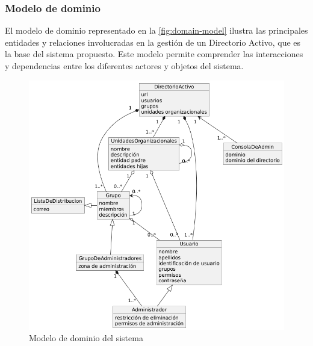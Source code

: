 \subsubsection{Modelo de dominio}

El modelo de dominio representado en la \autoref{fig:domain-model} ilustra las principales entidades y relaciones involucradas en la gestión de un Directorio Activo, que es la base del sistema propuesto. Este modelo permite comprender las interacciones y dependencias entre los diferentes actores y objetos del sistema.

\begin{figure}[H]
    \centering
    \includegraphics[width=\linewidth]{images/puml/domain-diagram/domain diagram.png}
    \caption{Modelo de dominio del sistema}
    \label{fig:domain-model}
\end{figure}